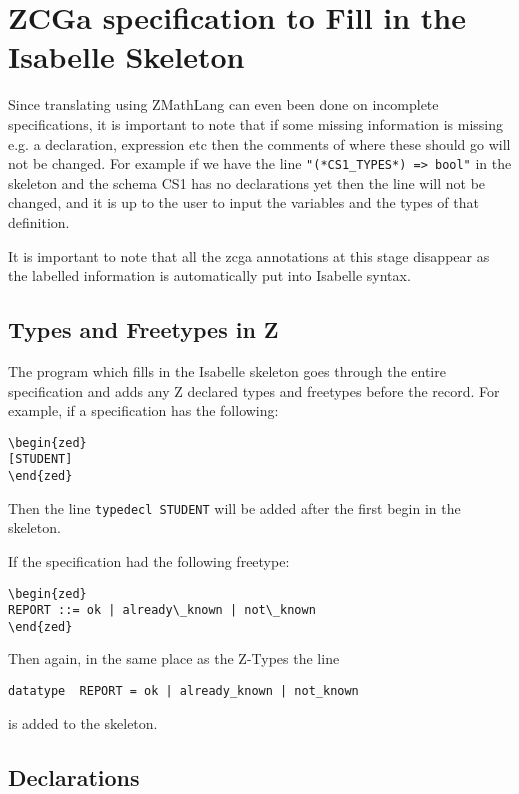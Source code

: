 \section{ZCGa specification to Fill in the Isabelle Skeleton}
\label{sec:zcga2fillin}

Since translating using ZMathLang can even been done on incomplete specifications, it is important to
note that if some missing information is missing e.g. a declaration, expression
etc then the comments of where these should go will not be changed. For example
if we have the line \verb|"(*CS1_TYPES*) => bool"| in the skeleton and the
schema CS1 has no declarations yet then the line will not be changed, and it is
up to the user to input the variables and the types of that definition.

It is important to note that all the \gls{zcga} annotations at this stage
disappear as the labelled information is automatically put into Isabelle syntax.

\subsection{Types and Freetypes in Z}

The program which fills in the Isabelle skeleton goes through the entire
specification and adds any Z declared types and freetypes before the record. For
example, if a specification has the following:
\begin{verbatim}
\begin{zed}
[STUDENT]
\end{zed}
\end{verbatim}

Then the line \verb|typedecl STUDENT| will be added after the first begin in the
skeleton.

If the specification had the following freetype:
\begin{verbatim}
\begin{zed} 
REPORT ::= ok | already\_known | not\_known
\end{zed}
\end{verbatim}

Then again, in the same place as the Z-Types the line
\begin{verbatim}
datatype  REPORT = ok | already_known | not_known
\end{verbatim}
is added to the skeleton.

\subsection{Declarations}


